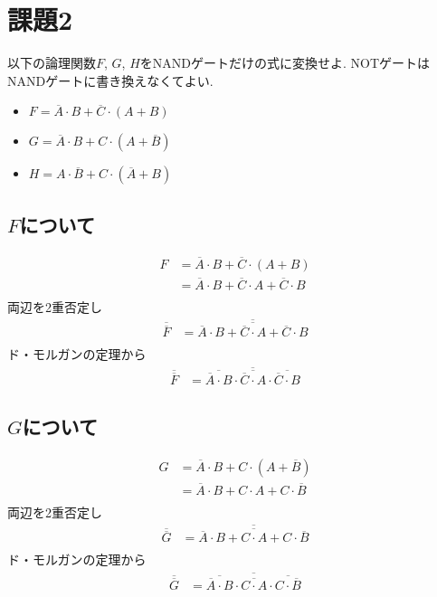 \section{課題2}
以下の論理関数$F$, $G$, $H$をNANDゲートだけの式に変換せよ.
NOTゲートはNANDゲートに書き換えなくてよい.
\begin{itemize}
  \item $F=\overline{A}\cdot{B}+\overline{C}\cdot(A+B)$
  \item $G=\overline{A}\cdot{B}+C\cdot(A+\overline{B})$
  \item $H=A\cdot\overline{B}+C\cdot(\overline{A}+B)$
\end{itemize}
\subsection{$F$について}
\begin{align*}
  F&=\overline{A}\cdot{B}+\overline{C}\cdot(A+B)\\
  &=\overline{A}\cdot{B}+\overline{C}\cdot{A}+\overline{C}\cdot{B}\\
\end{align*}
両辺を2重否定し
\begin{align*}
  \overline{\overline{F}}&=\overline{\overline{\overline{A}\cdot{B}+\overline{C}\cdot{A}+\overline{C}\cdot{B}}}\\
\end{align*}
ド・モルガンの定理から
\begin{align*}
  \overline{\overline{F}}&=\overline{\overline{\overline{A}\cdot{B}}\cdot\overline{\overline{C}\cdot{A}}\cdot\overline{\overline{C}\cdot{B}}}
\end{align*}
\subsection{$G$について}
\begin{align*}
  G&=\overline{A}\cdot{B}+C\cdot(A+\overline{B})\\
  &=\overline{A}\cdot{B}+C\cdot{A}+C\cdot\overline{B}\\
\end{align*}
両辺を2重否定し
\begin{align*}
  \overline{\overline{G}}&=\overline{\overline{\overline{A}\cdot{B}+C\cdot{A}+C\cdot\overline{B}}}\\
\end{align*}
ド・モルガンの定理から
\begin{align*}
  \overline{\overline{G}}&=\overline{\overline{\overline{A}\cdot{B}}\cdot\overline{C\cdot{A}}\cdot\overline{C\cdot\overline{B}}}
\end{align*}

